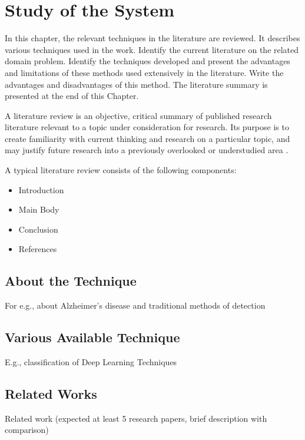 
\chapter{Study of the System} \label{chap2}

\newpage

In this chapter, the relevant techniques in the literature are reviewed. It describes various techniques used in the work.  Identify the current literature on the related domain problem. Identify the techniques developed and present the advantages and limitations of these methods used extensively in the literature. Write the advantages and disadvantages of this method. The literature summary is presented at the end of this Chapter.

A literature review is an objective, critical summary of published research literature relevant to a topic under consideration for research. Its purpose is to create familiarity with current thinking and research on a particular topic, and may justify future research into a previously overlooked or understudied area \cite{Gonzalez12}. 

A typical literature review consists of the following components:

\begin{itemize}
\item{Introduction}
\item{Main Body}
\item{Conclusion}
\item{References}
\end{itemize}


\section{About the Technique}
For e.g., about Alzheimer's disease and traditional methods of detection

\section{Various Available Technique}
E.g., classification of Deep Learning Techniques


\section{Related Works}
Related work (expected at least 5 research papers, brief description with comparison)



	




